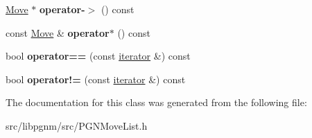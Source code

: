 \begin{DoxyCompactItemize}
\item 
\hypertarget{classpgn_1_1MoveList_1_1iterator_a7c503b86c46a1eb18dd2cd0404d77369}{
\hyperlink{classpgn_1_1Move}{Move} $\ast$ {\bfseries operator-\/$>$} () const }
\label{classpgn_1_1MoveList_1_1iterator_a7c503b86c46a1eb18dd2cd0404d77369}

\item 
\hypertarget{classpgn_1_1MoveList_1_1iterator_a53bb952bf4b7855bab53b25ee0d1ea35}{
const \hyperlink{classpgn_1_1Move}{Move} \& {\bfseries operator$\ast$} () const }
\label{classpgn_1_1MoveList_1_1iterator_a53bb952bf4b7855bab53b25ee0d1ea35}

\item 
\hypertarget{classpgn_1_1MoveList_1_1iterator_a5bf2be372b1da555d6c16875005fa0bd}{
bool {\bfseries operator==} (const \hyperlink{classpgn_1_1MoveList_1_1iterator}{iterator} \&) const }
\label{classpgn_1_1MoveList_1_1iterator_a5bf2be372b1da555d6c16875005fa0bd}

\item 
\hypertarget{classpgn_1_1MoveList_1_1iterator_ac70080907e3d1c8869bf6ce035bcd6da}{
bool {\bfseries operator!=} (const \hyperlink{classpgn_1_1MoveList_1_1iterator}{iterator} \&) const }
\label{classpgn_1_1MoveList_1_1iterator_ac70080907e3d1c8869bf6ce035bcd6da}

\end{DoxyCompactItemize}


The documentation for this class was generated from the following file:\begin{DoxyCompactItemize}
\item 
src/libpgnm/src/PGNMoveList.h\end{DoxyCompactItemize}
